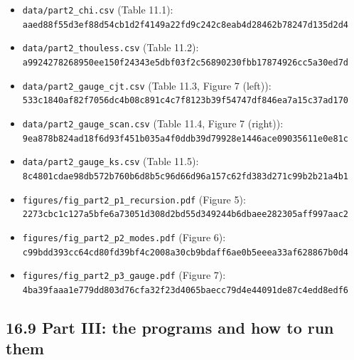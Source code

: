 \documentclass[
  10pt,
]{article}
\begin{document}
\begin{itemize}
  \texttt{cb027b170c5313894e9550e12ca2622ee9bbbbb64725bce1ed0661d77daa239d}\strut \\
  \texttt{f8d0d1d953f6445ffcae3a09692fdedbaf592bcd26f0f9037f0e8c4247d50d36}\strut \\
  \texttt{3e36c3f70c823d06e9bcadcda02b825610293332d7c6effd5b6538761a1949ca}
\item
  \texttt{data/part2\_chi.csv} (Table 11.1):\\
  \texttt{aaed88f55d3ef88d54cb1d2f4149a22fd9c242c8eab4d28462b78247d135d2d4}
\item
  \texttt{data/part2\_thouless.csv} (Table 11.2):\\
  \texttt{a9924278268950ee150f24343e5dbf03f2c56890230fbb17874926cc5a30ed7d}
\item
  \texttt{data/part2\_gauge\_cjt.csv} (Table 11.3, Figure 7 (left)):\\
  \texttt{533c1840af82f7056dc4b08c891c4c7f8123b39f54747df846ea7a15c37ad170}
\item
  \texttt{data/part2\_gauge\_scan.csv} (Table 11.4, Figure 7 (right)):\\
  \texttt{9ea878b824ad18f6d93f451b035a4f0ddb39d79928e1446ace09035611e0e81c}
\item
  \texttt{data/part2\_gauge\_ks.csv} (Table 11.5):\\
  \texttt{8c4801cdae98db572b760b6d8b5c96d66d96a157c62fd383d271c99b2b21a4b1}
\item
  \texttt{figures/fig\_part2\_p1\_recursion.pdf} (Figure 5):\\
  \texttt{2273cbc1c127a5bfe6a73051d308d2bd55d349244b6dbaee282305aff997aac2}
\item
  \texttt{figures/fig\_part2\_p2\_modes.pdf} (Figure 6):\\
  \texttt{c99bdd393cc64cd80fd39bf4c2008a30cb9bdaff6ae0b5eeea33af628867b0d4}
\item
  \texttt{figures/fig\_part2\_p3\_gauge.pdf} (Figure 7):\\
  \texttt{4ba39faaa1e779dd803d76cfa32f23d4065baecc79d4e44091de87c4edd8edf6}
\end{itemize}

\hypertarget{part-iii-the-programs-and-how-to-run-them}{%
\subsection{16.9 Part III: the programs and how to run
them}\label{part-iii-the-programs-and-how-to-run-them}}
\end{document}
